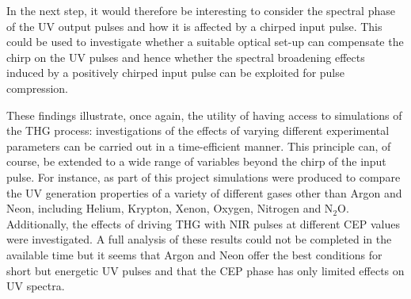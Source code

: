 \documentclass[a4paper]{jpconf}
\begin{document}
In the next step, it would therefore be interesting to consider the spectral phase of the UV output pulses and how it is affected by a chirped input pulse. This could be used to investigate whether a suitable optical set-up can compensate the chirp on the UV pulses and hence whether the spectral broadening effects  induced by a positively chirped input pulse can be exploited for pulse compression. \par 
These findings illustrate, once again, the utility of having access to simulations of the THG process:   
investigations of the effects of varying different experimental parameters can be carried out in a time-efficient manner. This principle can, of course, be extended to a wide range of variables beyond the chirp of the input pulse. For instance, as part of this project simulations were produced to compare the UV generation properties of a variety of different gases other than Argon and Neon, including Helium, Krypton, Xenon, Oxygen, Nitrogen and N$_2$O. Additionally, the effects of driving THG with NIR pulses at different CEP values were investigated. A full analysis of these results could not be completed in the available time but it seems that Argon and Neon offer the best conditions for short but energetic UV pulses and that the CEP phase has only limited effects on UV spectra. 
\end{document}
